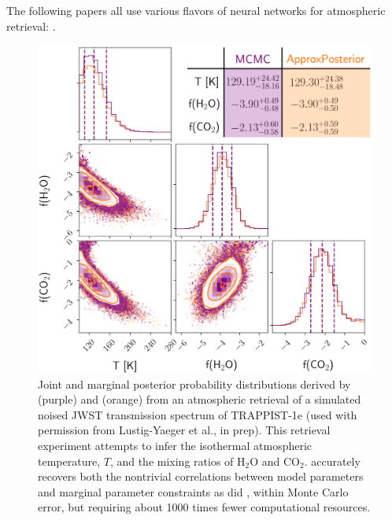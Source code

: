 The following papers all use various flavors of neural networks for atmospheric retrieval: \citep{Waldmann2016,MarquezNeila2018,Zingales2018,Cobb2019,Fisher2019,Himes2020}.

\begin{figure}
\centering
	\includegraphics[width=\textwidth]{emceeAPComparison.png}
   \caption{Joint and marginal posterior probability distributions derived by \emcee (purple) and \approxposterior (orange) from an atmospheric retrieval of a simulated noised JWST transmission spectrum of TRAPPIST-1e (used with permission from Lustig-Yaeger et al., in prep). This retrieval experiment attempts to infer the isothermal atmospheric temperature, $T$, and the mixing ratios of H$_2$O and CO$_2$. \approxposterior accurately recovers both the nontrivial correlations between model parameters and marginal parameter constraints as did \emcee, within Monte Carlo error, but requiring about 1000 times fewer computational resources.}%
    \label{AP:fig:comparison}%
\end{figure}